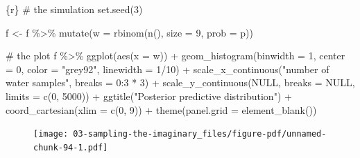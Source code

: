 \documentclass[
  letterpaper,
  DIV=11,
  numbers=noendperiod]{scrreprt}
\newenvironment{Shaded}{\begin{snugshade}}{\end{snugshade}}
\newcommand{\AttributeTok}[1]{\textcolor[rgb]{0.40,0.45,0.13}{#1}}
\newcommand{\CommentTok}[1]{\textcolor[rgb]{0.37,0.37,0.37}{#1}}
\newcommand{\ConstantTok}[1]{\textcolor[rgb]{0.56,0.35,0.01}{#1}}
\newcommand{\DecValTok}[1]{\textcolor[rgb]{0.68,0.00,0.00}{#1}}
\newcommand{\FunctionTok}[1]{\textcolor[rgb]{0.28,0.35,0.67}{#1}}
\newcommand{\InformationTok}[1]{\textcolor[rgb]{0.37,0.37,0.37}{#1}}
\newcommand{\NormalTok}[1]{\textcolor[rgb]{0.00,0.23,0.31}{#1}}
\newcommand{\OtherTok}[1]{\textcolor[rgb]{0.00,0.23,0.31}{#1}}
\newcommand{\SpecialCharTok}[1]{\textcolor[rgb]{0.37,0.37,0.37}{#1}}
\newcommand{\StringTok}[1]{\textcolor[rgb]{0.13,0.47,0.30}{#1}}
\begin{document}
\begin{Shaded}
\begin{Highlighting}[]
\InformationTok{\textasciigrave{}\textasciigrave{}\textasciigrave{}\{r\}}
\CommentTok{\# the simulation}
\FunctionTok{set.seed}\NormalTok{(}\DecValTok{3}\NormalTok{)}

\NormalTok{f }\OtherTok{\textless{}{-}}
\NormalTok{  f }\SpecialCharTok{\%\textgreater{}\%} 
  \FunctionTok{mutate}\NormalTok{(}\AttributeTok{w =} \FunctionTok{rbinom}\NormalTok{(}\FunctionTok{n}\NormalTok{(), }\AttributeTok{size =} \DecValTok{9}\NormalTok{,  }\AttributeTok{prob =}\NormalTok{ p))}

\CommentTok{\# the plot}
\NormalTok{f }\SpecialCharTok{\%\textgreater{}\%} 
  \FunctionTok{ggplot}\NormalTok{(}\FunctionTok{aes}\NormalTok{(}\AttributeTok{x =}\NormalTok{ w)) }\SpecialCharTok{+}
  \FunctionTok{geom\_histogram}\NormalTok{(}\AttributeTok{binwidth =} \DecValTok{1}\NormalTok{, }\AttributeTok{center =} \DecValTok{0}\NormalTok{,}
                 \AttributeTok{color =} \StringTok{"grey92"}\NormalTok{, }\AttributeTok{linewidth =} \DecValTok{1}\SpecialCharTok{/}\DecValTok{10}\NormalTok{) }\SpecialCharTok{+}
  \FunctionTok{scale\_x\_continuous}\NormalTok{(}\StringTok{"number of water samples"}\NormalTok{, }\AttributeTok{breaks =} \DecValTok{0}\SpecialCharTok{:}\DecValTok{3} \SpecialCharTok{*} \DecValTok{3}\NormalTok{) }\SpecialCharTok{+}
  \FunctionTok{scale\_y\_continuous}\NormalTok{(}\ConstantTok{NULL}\NormalTok{, }\AttributeTok{breaks =} \ConstantTok{NULL}\NormalTok{, }\AttributeTok{limits =} \FunctionTok{c}\NormalTok{(}\DecValTok{0}\NormalTok{, }\DecValTok{5000}\NormalTok{)) }\SpecialCharTok{+}
  \FunctionTok{ggtitle}\NormalTok{(}\StringTok{"Posterior predictive distribution"}\NormalTok{) }\SpecialCharTok{+}
  \FunctionTok{coord\_cartesian}\NormalTok{(}\AttributeTok{xlim =} \FunctionTok{c}\NormalTok{(}\DecValTok{0}\NormalTok{, }\DecValTok{9}\NormalTok{)) }\SpecialCharTok{+}
  \FunctionTok{theme}\NormalTok{(}\AttributeTok{panel.grid =} \FunctionTok{element\_blank}\NormalTok{())}
\InformationTok{\textasciigrave{}\textasciigrave{}\textasciigrave{}}
\end{Highlighting}
\end{Shaded}

\begin{figure}[H]

{\centering \texttt{[image: 03-sampling-the-imaginary\_files/figure-pdf/unnamed-chunk-94-1.pdf]}

}

\end{figure}
\end{document}
